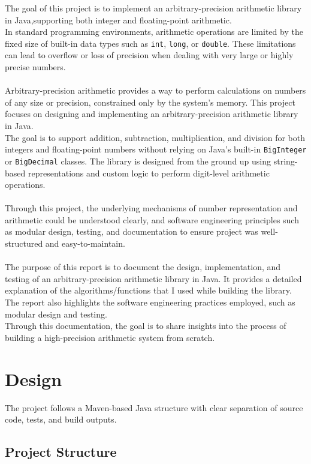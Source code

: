\documentclass[12pt]{article}
\begin{document}
\begin{spacing}{1.2}
The goal of this project is to implement an arbitrary-precision arithmetic library in Java,supporting both integer and floating-point arithmetic.\\In standard programming environments, arithmetic operations are limited by the fixed size of built-in data types such as \texttt{int}, \texttt{long}, or \texttt{double}. These limitations can lead to overflow or loss of precision when dealing with very large or highly precise numbers.\\\\
Arbitrary-precision arithmetic provides a way to perform calculations on numbers of any size or precision, constrained only by the system's memory. This project focuses on designing and implementing an arbitrary-precision arithmetic library in Java.\\
The goal is to support addition, subtraction, multiplication, and division for both integers and floating-point numbers without relying on Java's built-in \texttt{BigInteger} or \texttt{BigDecimal} classes. The library is designed from the ground up using string-based representations and custom logic to perform digit-level arithmetic operations.\\\\
Through this project, the underlying mechanisms of number representation and arithmetic could be understood clearly, and software engineering principles such as modular design, testing, and documentation to ensure project was well-structured and easy-to-maintain.\\\\
The purpose of this report is to document the design, implementation, and testing of an arbitrary-precision arithmetic library in Java. It provides a detailed explanation of the algorithms/functions that I used while building the library. The report also highlights the software engineering practices employed, such as modular design and testing.\\
Through this documentation, the goal is to share insights into the process of building a high-precision arithmetic system from scratch.


\section{Design}
The project follows a Maven-based Java structure with clear separation of source code, tests, and build outputs.

\subsection{Project Structure}



\end{spacing}
\end{document}
